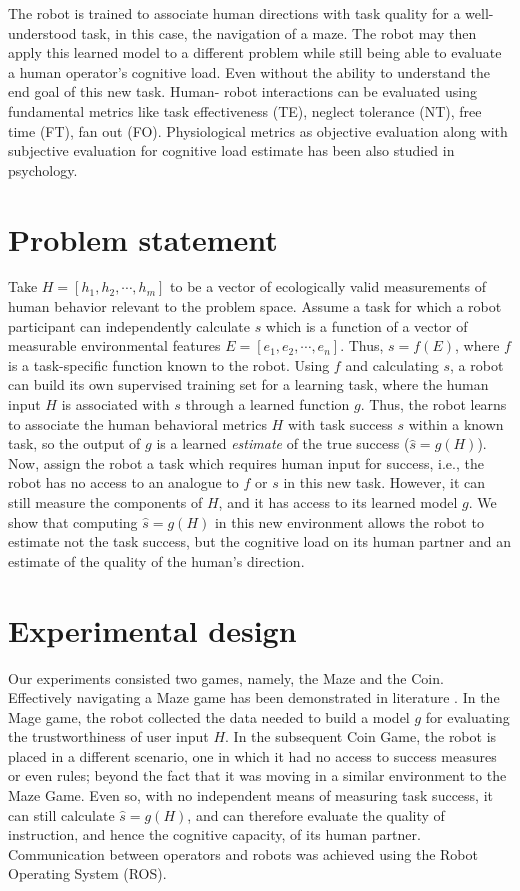 \documentclass{sig-alternate}
\begin{document}
The robot is trained to associate human directions with task quality for a well-understood task, in this case, the
navigation of a maze. The robot may then apply this learned model to a different problem while still being able to
evaluate a human operator's cognitive load. Even without the ability to understand the end goal of this new task. Human-
robot interactions can be evaluated using fundamental metrics \cite{olsen2003metrics} like task effectiveness (TE),
neglect tolerance (NT), free time (FT), fan out (FO). Physiological metrics as objective evaluation along with
subjective evaluation for cognitive load estimate has been also studied in psychology\cite{Brookings1996361}.

\section{Problem statement} Take $H=[h_1,h_2,\cdots,h_m]$ to be a vector of ecologically
valid measurements of human behavior relevant to the problem space.  Assume a task for which a robot participant can
independently calculate $s$ which is a function of a vector of measurable environmental features
$E=[e_1,e_2,\cdots,e_n]$.  Thus, $s = f(E)$, where $f$ is a task-specific function known to the robot.  Using $f$ and
calculating $s$, a robot can build its own supervised training set for a learning task, where the human input $H$ is
associated with $s$ through a learned function $g$.  Thus, the robot learns to associate the human behavioral metrics
$H$ with task success $s$ within a known task, so the output of $g$ is a learned \emph{estimate} of the true success
($\hat{s}=g(H)$).  Now, assign the robot a task which requires human input for success, i.e., the robot has no access to
an analogue to $f$ or $s$ in this new task.  However, it can still measure the components of $H$, and it has access to
its learned model $g$.  We show that computing $\hat{s}=g(H)$ in this new environment allows the robot to estimate not
the task success, but the cognitive load on its human partner and an estimate of the quality of the human's direction.

\section{Experimental design} 
Our experiments consisted two games, namely, the Maze and the Coin. Effectively
navigating a Maze game has been demonstrated in literature \cite{crick2011human}. In the Mage game, the robot collected
the data needed to build a model $g$ for evaluating the trustworthiness of user input $H$. In the subsequent Coin Game,
the robot is placed in a different scenario, one in which it had no access to success measures or even rules; beyond the
fact that it was moving in a similar environment to the Maze Game. Even so, with no independent means of measuring task
success, it can still calculate $\hat{s}=g(H)$, and can therefore evaluate the quality of instruction, and hence the
cognitive capacity, of its human partner. Communication between operators and robots was achieved using the Robot Operating System (ROS).
\end{document}
